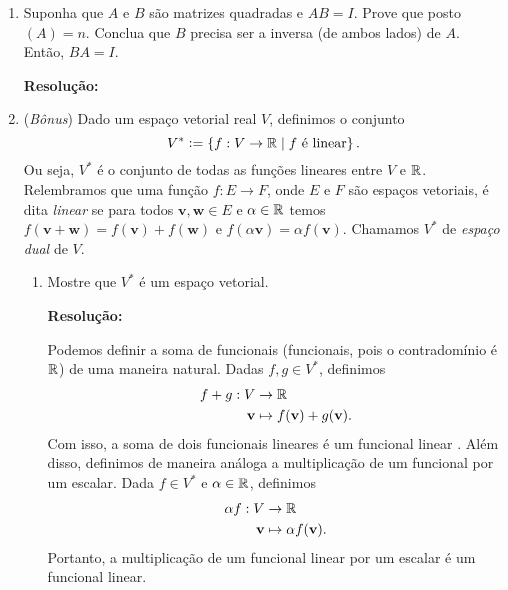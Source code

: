 \documentclass[leqno]{article}
\numberwithin{equation}{section}
\newcommand{\bfw}{\mathbf{w}}
\newcommand{\bfv}{\mathbf{v}}
\newenvironment{sol}
{
    \vspace{4mm}
    \noindent\textbf{Resolução:}
    \strut\newline
    \smallskip
    \hspace{-3.5mm}
}
{}
\begin{document}
\begin{enumerate}
        \begin{sol} 
        \end{sol} 

    \item Suponha que $A$ e $B$ são matrizes quadradas e $AB = I$. Prove que posto$(A) = n$. Conclua que $B$ precisa ser a inversa (de ambos lados) de $A$. Então, $BA = I$.

        \begin{sol} 
        \end{sol} 

    \item (\textit{Bônus}) Dado um espaço vetorial real \( V \), definimos o conjunto
        \begin{equation*}
            V^{ * } \vcentcolon= \left\{ f : V \to \mathbb{R} \mid f \text{ é linear} \right\}
        .\end{equation*}
        Ou seja, \( V^{ * } \) é o conjunto de todas as funções lineares entre \( V \) e \( \mathbb{R} \).
        Relembramos que uma função \( f : E \to F \), onde \( E \) e \( F \) são espaços vetoriais, é dita \textit{linear} se para todos \( \bfv, \bfw \in E \) e \( \alpha \in \mathbb{R} \) temos \( f ( \bfv + \bfw ) = f ( \bfv ) + f ( \bfw ) \) e \( f ( \alpha \bfv ) = \alpha f ( \bfv ) \).
        Chamamos \( V^{ * } \) de \textit{espaço dual} de \( V \).
        \begin{enumerate}
            \item Mostre que \( V^{ * } \) é um espaço vetorial.

                \begin{sol} 
                    Podemos definir a soma de funcionais (funcionais, pois o contradomínio é \( \mathbb{R} \)) de uma maneira natural.
                    Dadas \( f, g \in V^{ * } \), definimos
                    \begin{align*}
                        f + g : V &\to \R \\
                        \bfv &\mapsto f ( \bfv ) + g ( \bfv )
                    .\end{align*}
                \end{sol} 
                Com isso, a soma de dois funcionais lineares é um funcional linear .
                Além disso, definimos de maneira análoga a multiplicação de um funcional por um escalar.
                Dada \( f \in V^{ * } \) e \( \alpha \in \mathbb{R} \), definimos
                \begin{align*}
                    \alpha f : V &\to \R \\
                    \bfv &\mapsto \alpha f ( \bfv )
                .\end{align*}
                Portanto, a multiplicação de um funcional linear por um escalar é um funcional linear.


\end{enumerate}
\end{enumerate}
\end{document}
